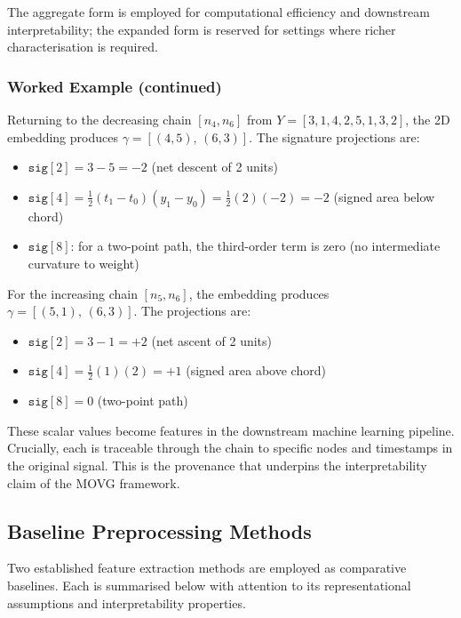 \documentclass[a4paper,12pt]{article}
\begin{document}
The aggregate form is employed for computational efficiency and downstream interpretability; the expanded form is reserved for settings where richer characterisation is required.

\subsubsection{Worked Example (continued)}

Returning to the decreasing chain $[n_4, n_6]$ from $Y = [3, 1, 4, 2, 5, 1, 3, 2]$, the 2D embedding produces $\gamma = [(4, 5),\, (6, 3)]$. The signature projections are:
\begin{itemize}
    \item $\texttt{sig}[2] = 3 - 5 = -2$ \quad (net descent of 2 units)
    \item $\texttt{sig}[4] = \frac{1}{2}(t_1 - t_0)(y_1 - y_0) = \frac{1}{2}(2)(-2) = -2$ \quad (signed area below chord)
    \item $\texttt{sig}[8]$: for a two-point path, the third-order term is zero (no intermediate curvature to weight)
\end{itemize}

For the increasing chain $[n_5, n_6]$, the embedding produces $\gamma = [(5, 1),\, (6, 3)]$. The projections are:
\begin{itemize}
    \item $\texttt{sig}[2] = 3 - 1 = +2$ \quad (net ascent of 2 units)
    \item $\texttt{sig}[4] = \frac{1}{2}(1)(2) = +1$ \quad (signed area above chord)
    \item $\texttt{sig}[8] = 0$ \quad (two-point path)
\end{itemize}

These scalar values become features in the downstream machine learning pipeline. Crucially, each is traceable through the chain to specific nodes and timestamps in the original signal. This is the provenance that underpins the interpretability claim of the MOVG framework.

\subsection{Baseline Preprocessing Methods}
\label{sec:baselines}

Two established feature extraction methods are employed as comparative baselines. Each is summarised below with attention to its representational assumptions and interpretability properties.
\end{document}
